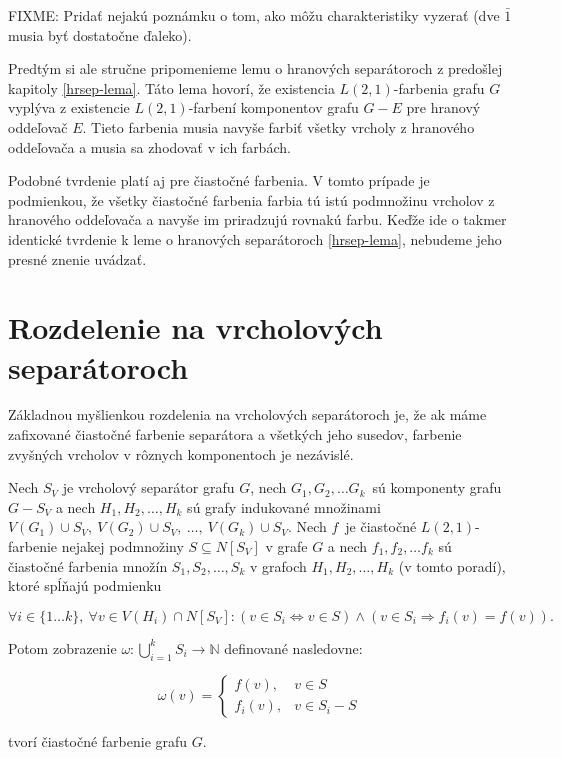 FIXME: Pridať nejakú poznámku o tom, ako môžu charakteristiky vyzerať (dve $\bar{1}$ musia byť
dostatočne ďaleko).

Predtým si ale stručne pripomenieme lemu o hranových separátoroch z predošlej kapitoly \ref{hrsep-lema}.
Táto lema hovorí, že existencia $L(2,1)$-farbenia grafu $G$ vyplýva z existencie $L(2,1)$-farbení
komponentov grafu $G-E$ pre hranový oddeľovač $E$. Tieto farbenia musia navyše farbiť všetky vrcholy
z hranového oddeľovača a musia sa zhodovať v ich farbách.

Podobné tvrdenie platí aj pre čiastočné farbenia. V tomto prípade je podmienkou, že všetky čiastočné
farbenia farbia tú istú podmnožinu vrcholov z hranového oddeľovača a navyše im priradzujú rovnakú farbu.
Keďže ide o takmer identické tvrdenie k leme o hranových separátoroch \ref{hrsep-lema}, nebudeme
jeho presné znenie uvádzať.

\section{Rozdelenie na vrcholových separátoroch}

Základnou myšlienkou rozdelenia na vrcholových separátoroch je, že ak máme zafixované čiastočné
farbenie separátora a všetkých jeho susedov, farbenie zvyšných vrcholov v rôznych komponentoch
je nezávislé.

\begin{lema}
    Nech $S_V$ je vrcholový separátor grafu $G$, nech $G_1, G_2, \ldots G_k$ sú komponenty
    grafu $G - S_V$ a nech $H_1, H_2, \ldots, H_k$ sú grafy indukované množinami $V(G_1) \cup S_V,\ V(G_2) \cup S_V,\ \ldots,\ V(G_k) \cup S_V$.
    Nech $f$ je čiastočné $L(2,1)$-farbenie nejakej podmnožiny $S \subseteq N[S_V]$ v grafe $G$ a nech $f_1, f_2, \ldots f_k$
    sú čiastočné farbenia množín $S_1, S_2, \ldots, S_k$ v grafoch $H_1, H_2, \ldots, H_k$ (v tomto poradí), ktoré spĺňajú podmienku

    $$ \forall i \in \{1 \ldots k\},\ \forall v \in V(H_i) \cap N[S_V]: (v \in S_i \Leftrightarrow v \in S) \wedge (v \in S_i \Rightarrow f_i(v) = f(v)).$$

    Potom zobrazenie $\omega: \bigcup \limits_{i=1}^k S_i \to \mathbb{N}$ definované nasledovne:

    \[ \omega(v) =
    \begin{cases}
        f(v), & v \in S \\
        f_i(v), & v \in S_i - S
    \end{cases}
    \]

    tvorí čiastočné farbenie grafu $G$.
\end{lema}

